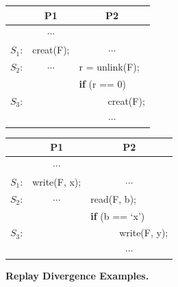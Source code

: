 \begin{figure}[t]
  \begin{minipage}{\linewidth}
    \centering
    \begin{minipage}{.42\linewidth}
      \begin{rbox}
        \centering
        \begin{tabular}{ccc}
                 & {\bf P1}  & {\bf P2}                                \\ \hline
                 & $\cdots$  &                                         \\
          $S_1$: & creat(F); & $\cdots$                                \\
          $S_2$: & $\cdots$  & \multicolumn{1}{l}{ r = unlink(F); }    \\
                 &           & \multicolumn{1}{l}{ {\bf if} (r == 0) } \\
          $S_3$: &           & \multicolumn{1}{l}{ ~~~~~~creat(F); }   \\
                 &           & $\cdots$                                \\
        \end{tabular}
      \end{rbox}
      \vspace{-2.2em}
    \end{minipage}
    \hspace{3em}
    \begin{minipage}{.42\linewidth}
      \begin{rbox}
        \centering
        \begin{tabular}{ccc}
                 & {\bf P1}     & {\bf P2}                                  \\ \hline
                 & $\cdots$     &                                           \\
          $S_1$: & write(F, x); & $\cdots$                                  \\
          $S_2$: & $\cdots$     & \multicolumn{1}{l}{ read(F, b); }         \\
                 &              & \multicolumn{1}{l}{ {\bf if} (b == `x') } \\
          $S_3$: &              & \multicolumn{1}{l}{ ~~~~~~write(F, y); }  \\
                 &              & $\cdots$                                  \\
        \end{tabular}
      \end{rbox}
      \vspace{-2.2em}
    \end{minipage}
  \end{minipage}
  \caption{{\bf Replay Divergence Examples.}}
  \label{racepro:fig:diverge}
\end{figure}

